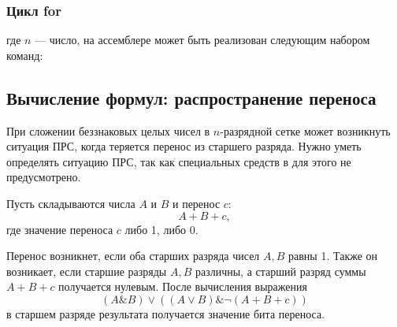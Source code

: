 \subsubsection{Цикл for}

\begin{algorithmic}[1]
        \STATE{} 
    \ENDFOR
\end{algorithmic}
где $n$ --- число, на ассемблере может быть реализован следующим набором команд:

\begin{algorithmic}[1]
     
     
    \STATE{}
     
\end{algorithmic}


\subsection{Вычисление формул: распространение переноса}
\label{ch:risc:p}

При сложении беззнаковых целых чисел в $n$-разрядной сетке может возникнуть ситуация ПРС, когда теряется перенос из старшего разряда. Нужно уметь определять ситуацию ПРС, так как специальных средств в {\MyProc} для этого не предусмотрено.

Пусть складываются числа $A$ и $B$ и перенос $c$:
\[
    A + B + c,
\]
где значение переноса $c$ либо 1, либо 0.

Перенос возникнет, если оба старших разряда чисел $A,B$ равны 1. Также он возникает, если старшие разряды $A,B$ различны, а старший разряд суммы $A+B+c$ получается нулевым. После вычисления выражения
\[
    (A\& B)\lor ((A \lor B) \& \lnot(A + B + c))
\]
в старшем разряде результата получается значение бита переноса.


